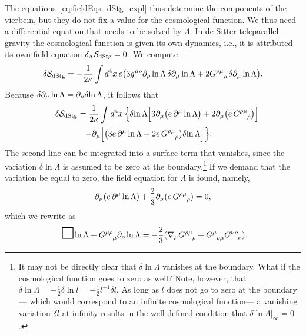 \documentclass[
final,
11pt,
a4paper,
DIV=11,
headinclude=true,
footinclude=false,
bibliography=totoc,
twoside=true,  %
BCOR=5mm
]{scrbook}
\begin{document}
The equations~\eqref{eq:fieldEqs_dStg_expl} thus determine the 
components of the vierbein, but they do not fix a value for the 
cosmological function.  We thus need a differential equation that 
needs to be solved by $\Lambda$. In de Sitter teleparallel 
gravity the cosmological function is given its own dynamics, 
i.e., it is attributed its own field equation $\delta_\Lambda 
\mathcal{S}_\mathrm{dStg} = 0$. We compute
\begin{equation*}
  \delta \mc{S}_\mrm{dStg} = -\frac{1}{2\kappa} \int d^4x\, 
  e \big( 3 g^{\mu\rho} \pd_\rho \ln \Lambda \,\delta \pd_\mu \ln 
  \Lambda + 2 G\ind{^{\rho\mu}_\rho} \,\delta \pd_\mu \ln \Lambda 
  \big).
\end{equation*}
Because $\delta \partial_\mu \ln \Lambda = \partial_\mu \delta\! \ln 
\Lambda$, it follows that
\begin{multline*}
  \hspace{1em}
  \delta \mc{S}_\mrm{dStg} = \frac{1}{2\kappa} \int d^4x \, 
  \Big\{ \delta\! \ln \Lambda \Big[3 \pd_\mu \big( e\, \pd^\mu 
  \ln \Lambda \big) + 2 \pd_\mu \big(e\, G\ind{^{\rho\mu}_\rho} 
  \big) \Big] \\
  - \pd_\mu \Big[ \big( 3 e\, \pd^\mu \ln \Lambda
  + 2 e\, G\ind{^{\rho\mu}_\rho} \big) \delta\! \ln \Lambda \Big] 
  \Big\}.
  \hspace{1em}
\end{multline*}
The second line can be integrated into a surface term that 
vanishes, since the variation $\delta\!\ln \Lambda$ is assumed to 
be zero at the boundary.\footnote{%
  It may not be directly clear that $\delta\!\ln \Lambda$ 
  vanishes at the boundary. What if the cosmological function 
  goes to zero as well? Note, however, that $\delta\!\ln \Lambda 
  = -\tfrac{1}{2} \delta\!\ln l = -\tfrac{1}{2} l^{-1} \delta l$.  
  As long as $l$ does not go to zero at the boundary--- which 
  would correspond to an infinite cosmological function--- 
  a vanishing variation $\delta l$ at infinity results in the 
  well-defined condition that $\delta\!\ln \Lambda|_\infty = 0$.
}
If we demand that the variation be equal to zero, the field 
equation for $\Lambda$ is found, namely,
\begin{equation*}
  \pd_\mu ( e\, \pd^\mu \ln \Lambda ) + \frac{2}{3} \pd_\mu (e\, 
  G\ind{^{\rho\mu}_\rho} ) = 0,
\end{equation*}
which we rewrite as
\begin{equation}
\label{eq:field_eq_lambda}
  \dal \ln \Lambda + G\ind{^{\mu\rho}_\mu} \pd_\rho \ln \Lambda =
  -\frac{2}{3} ( \nabla_\mu G\ind{^{\rho\mu}_\rho} 
  + G\ind{^\mu_{\rho\mu}} G\ind{^{\nu\rho}_\nu} ).
\end{equation}
\end{document}

